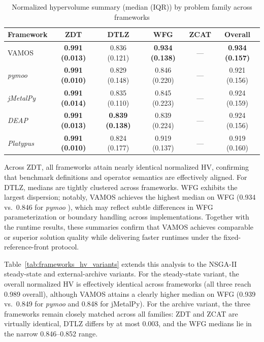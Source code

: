 \documentclass[journal]{IEEEtran}
\newcommand{\VAMOS}{VAMOS}
\begin{document}
\begin{table}[htbp]
\centering
\caption{Normalized hypervolume summary (median (IQR)) by problem family across frameworks}
\label{tab:frameworks_hv}
\begin{tabular}{@{}lccccc@{}}
\toprule
\textbf{Framework} & \textbf{ZDT} & \textbf{DTLZ} & \textbf{WFG} & \textbf{ZCAT} & \textbf{Overall} \\
\midrule
VAMOS & \textbf{0.991 (0.013)} & 0.836 (0.121) & \textbf{0.934 (0.138)} & --- & \textbf{0.934 (0.157)} \\
\textit{pymoo} & \textbf{0.991 (0.010)} & 0.829 (0.148) & 0.846 (0.220) & --- & 0.921 (0.156) \\
\textit{jMetalPy} & \textbf{0.991 (0.014)} & 0.835 (0.110) & 0.845 (0.223) & --- & 0.924 (0.159) \\
\textit{DEAP} & \textbf{0.991 (0.013)} & \textbf{0.839 (0.138)} & 0.839 (0.224) & --- & 0.924 (0.156) \\
\textit{Platypus} & \textbf{0.991 (0.010)} & 0.824 (0.177) & 0.919 (0.137) & --- & 0.919 (0.160) \\
\bottomrule
\end{tabular}
\end{table}

Across ZDT, all frameworks attain nearly identical normalized HV, confirming that benchmark definitions and operator semantics are effectively aligned. For DTLZ, medians are tightly clustered across frameworks. WFG exhibits the largest dispersion; notably, \VAMOS{} achieves the highest median on WFG (0.934 vs.\ 0.846 for \textit{pymoo} ), which may reflect subtle differences in WFG parameterization or boundary handling across implementations. Together with the runtime results, these summaries confirm that \VAMOS{} achieves comparable or superior solution quality while delivering faster runtimes under the fixed-reference-front protocol.

Table~\ref{tab:frameworks_hv_variants} extends this analysis to the NSGA-II steady-state and external-archive variants. For the steady-state variant, the overall normalized HV is effectively identical across frameworks (all three reach 0.989 overall), although \VAMOS{} attains a clearly higher median on WFG (0.939 vs.\ 0.849 for \textit{pymoo}  and 0.848 for jMetalPy). For the archive variant, the three frameworks remain closely matched across all families: ZDT and ZCAT are virtually identical, DTLZ differs by at most 0.003, and the WFG medians lie in the narrow 0.846--0.852 range.
\end{document}
